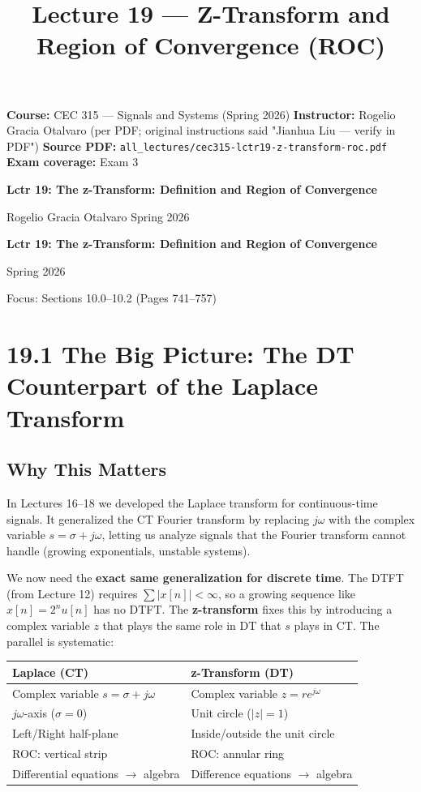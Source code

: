\documentclass[11pt]{article}
\title{Lecture 19 — Z-Transform and Region of Convergence (ROC)}
\author{}
\date{}
\begin{document}
\maketitle

\textbf{Course:} CEC 315 — Signals and Systems (Spring 2026)
\textbf{Instructor:} Rogelio Gracia Otalvaro (per PDF; original instructions said "Jianhua Liu — verify in PDF")
\textbf{Source PDF:} \texttt{all\_lectures/cec315-lctr19-z-transform-roc.pdf}
\textbf{Exam coverage:} Exam 3

\textbf{Lctr 19: The z-Transform: Definition and Region of Convergence}

Rogelio Gracia Otalvaro
Spring 2026

\textbf{Lctr 19: The z-Transform: Definition and Region of Convergence}

Spring 2026

Focus: Sections 10.0–10.2 (Pages 741–757)

\section*{19.1 The Big Picture: The DT Counterpart of the Laplace Transform}

\subsection*{Why This Matters}

In Lectures 16–18 we developed the Laplace transform for continuous-time signals. It generalized the CT Fourier transform by replacing $j\omega$ with the complex variable $s = \sigma + j\omega$, letting us analyze signals that the Fourier transform cannot handle (growing exponentials, unstable systems).

We now need the \textbf{exact same generalization for discrete time}. The DTFT (from Lecture 12) requires $\sum |x[n]| < \infty$, so a growing sequence like $x[n] = 2^n u[n]$ has no DTFT. The \textbf{z-transform} fixes this by introducing a complex variable $z$ that plays the same role in DT that $s$ plays in CT. The parallel is systematic:

\begin{center}
\begin{tabular}{|l|l|}
\hline
\textbf{Laplace (CT)} & \textbf{z-Transform (DT)} \\
\hline
Complex variable $s = \sigma + j\omega$ & Complex variable $z = r e^{j\omega}$ \\
\hline
$j\omega$-axis ($\sigma = 0$) & Unit circle ($|z| = 1$) \\
\hline
Left/Right half-plane & Inside/outside the unit circle \\
\hline
ROC: vertical strip & ROC: annular ring \\
\hline
Differential equations $\to$ algebra & Difference equations $\to$ algebra \\
\hline
\end{tabular}
\end{center}
\end{document}
